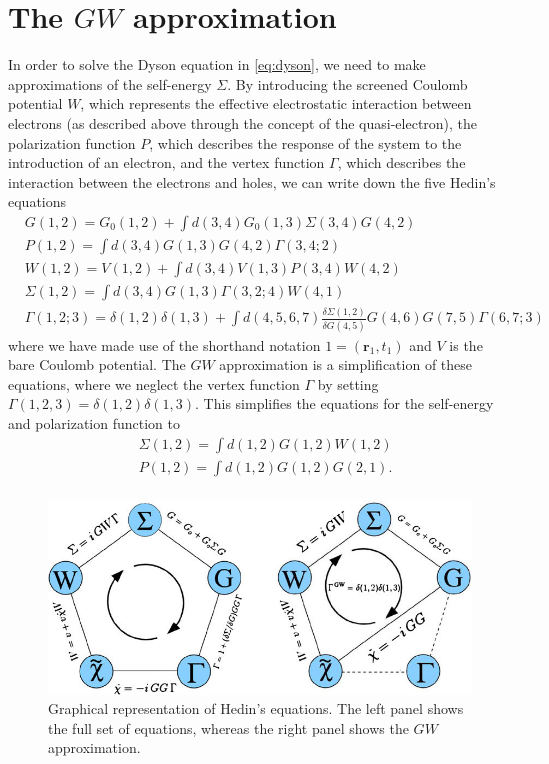 \documentclass[12pt]{article}
\begin{document}
\section{The $GW$ approximation}
In order to solve the Dyson equation in \ref{eq:dyson}, we need to make approximations of the self-energy $\Sigma$. By introducing the screened Coulomb potential $W$, which represents the effective electrostatic interaction between electrons (as described above through the concept of the quasi-electron), the polarization function $P$, which describes the response of the system to the introduction of an electron, and the vertex function $\Gamma$, which describes the interaction between the electrons and holes, we can write down the five Hedin's equations
\begin{equation}
\begin{aligned}
& G(1,2)=G_0(1,2)+\int d(3,4) G_0(1,3) \Sigma(3,4) G(4,2) \\
& P(1,2)=\int d(3,4) G(1,3) G(4,2) \Gamma(3,4 ; 2) \\
& W(1,2)=V(1,2)+\int d(3,4) V(1,3) P(3,4) W(4,2) \\
& \Sigma(1,2)=\int d(3,4) G(1,3) \Gamma(3,2 ; 4) W(4,1) \\
& \Gamma(1,2 ; 3)=\delta(1,2) \delta(1,3)+\int d(4,5,6,7) \frac{\delta \Sigma(1,2)}{\delta G(4,5)} G(4,6) G(7,5) \Gamma(6,7 ; 3)
\end{aligned}
\end{equation}
where we have made use of the shorthand notation $1=(\mathbf{r}_1, t_1)$ and $V$ is the bare Coulomb potential. The $GW$ approximation is a simplification of these equations, where we neglect the vertex function $\Gamma$ by setting $\Gamma (1,2,3)= \delta (1,2) \delta (1,3)$. This simplifies the equations for the self-energy and polarization function to
\begin{equation}
\begin{aligned}
& \Sigma(1,2)=\int d(1,2) G(1,2) W(1,2) \\
& P(1,2)=\int d(1,2) G(1,2) G(2,1). \\
\end{aligned}
\end{equation}
\begin{figure}
    \centering
    \includegraphics[width=\textwidth]{Left-panel-Graphical-representation-of-Hedins-equations-Right-panel-The-four-coupled.jpg}
    \caption{Graphical representation of Hedin's equations. The left panel shows the full set of equations, whereas the right panel shows the $GW$ approximation.}
    \label{fig:hedin}
\end{figure}
\end{document}
